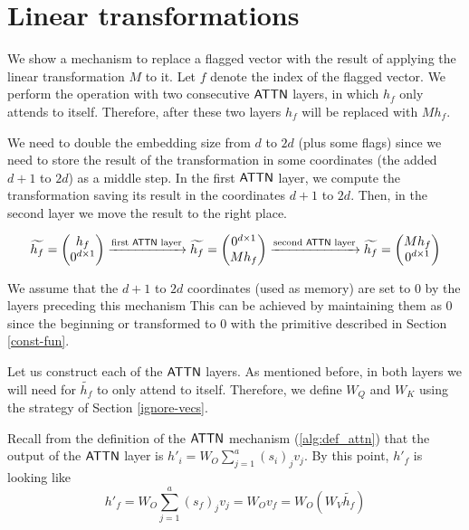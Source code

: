 \section{Linear transformations}\label{appendix:linear-transf}

We show a mechanism to replace a flagged vector with the result of applying the linear transformation $M$ to it.
Let $f$ denote the index of the flagged vector.
We perform the operation with two consecutive $\mathsf{ATTN}$ layers, in which $h_f$ only attends to itself.
Therefore, after these two layers $h_f$ will be replaced with $Mh_f$.

We need to double the embedding size from $d$ to $2d$ (plus some flags) since we need to store the result of the transformation in some coordinates (the added $d+1$ to $2d$) as a middle step.
In the first $\mathsf{ATTN}$ layer, we compute the transformation saving its result in the coordinates $d+1$ to $2d$.
Then, in the second layer we move the result to the right place.

\[
    \widetilde{h_f} = \left( \begin{matrix} h_f    \\ 0^{d \times 1}       \end{matrix} \right) 
    \xrightarrow{\text{first $\mathsf{ATTN}$ layer}}
    \widetilde{h_f} = \left( \begin{matrix} 0^{d \times 1}     \\  Mh_f \end{matrix} \right)
    \xrightarrow{\text{second $\mathsf{ATTN}$ layer}}
    \widetilde{h_f} = \left( \begin{matrix} Mh_f \\ 0^{d \times 1}      \end{matrix} \right)
\]

We assume that the $d+1$ to $2d$ coordinates (used as memory) are set to $0$ by the layers preceding this mechanism
This can be achieved by maintaining them as $0$ since the beginning or transformed to $0$ with the primitive described in Section \ref{const-fun}.

\medskip

Let us construct each of the $\mathsf{ATTN}$ layers.
As mentioned before, in both layers we will need for $\widetilde{h_f}$ to only attend to itself.
Therefore, we define $W_Q$ and $W_K$ using the strategy of Section \ref{ignore-vecs}.

Recall from the definition of the $\mathsf{ATTN}$ mechanism (\ref{alg:def_attn}) that the output of the $\mathsf{ATTN}$ layer is $h'_i = W_O \sum_{j=1}^a (s_i)_j v_j$. 
By this point, $h'_f$ is looking like \[ h'_f = W_O \sum_{j=1}^a (s_f)_j v_j = W_O v_f = W_O (W_V \widetilde{h_f}) \]

